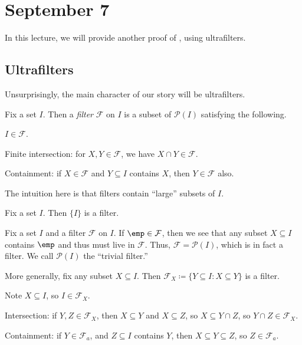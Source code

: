 \documentclass[../notes.tex]{subfiles}
\begin{document}
\section{September 7}

In this lecture, we will provide another proof of , using ultrafilters.

\subsection{Ultrafilters}
Unsurprisingly, the main character of our story will be ultrafilters.
\begin{definition}[filter]
	Fix a set $I$. Then a \textit{filter} $\mathcal F$ on $I$ is a subset of $\mathcal P(I)$ satisfying the following.
	\begin{listalph}
		\item $I\in\mathcal F$.
		\item Finite intersection: for $X,Y\in\mathcal F$, we have $X\cap Y\in\mathcal F$.
		\item Containment: if $X\in\mathcal F$ and $Y\subseteq I$ contains $X$, then $Y\in\mathcal F$ also.
	\end{listalph}
\end{definition}
The intuition here is that filters contain ``large'' subsets of $I$.
\begin{example}
	Fix a set $I$. Then $\{I\}$ is a filter.
\end{example}
\begin{example} \label{ex:trivial-filter}
	Fix a set $I$ and a filter $\mathcal F$ on $I$. If $\emp\in\mathcal F$, then we see that any subset $X\subseteq I$ contains $\emp$ and thus must live in $\mathcal F$. Thus, $\mathcal F=\mathcal P(I)$, which is in fact a filter. We call $\mathcal P(I)$ the ``trivial filter.''
\end{example}
\begin{example} \label{ex:almost-principal-filter}
	More generally, fix any subset $X\subseteq I$. Then $\mathcal F_X\coloneqq\{Y\subseteq I:X\subseteq Y\}$ is a filter.
	\begin{listalph}
		\item Note $X\subseteq I$, so $I\in\mathcal F_X$.
		\item Intersection: if $Y,Z\in\mathcal F_X$, then $X\subseteq Y$ and $X\subseteq Z$, so $X\subseteq Y\cap Z$, so $Y\cap Z\in\mathcal F_X$.
		\item Containment: if $Y\in\mathcal F_a$, and $Z\subseteq I$ contains $Y$, then $X\subseteq Y\subseteq Z$, so $Z\in\mathcal F_a$.
	\end{listalph}
\end{example}
\end{document}
